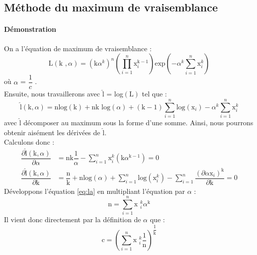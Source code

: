 \subsection{Méthode du maximum de vraisemblance}
\paragraph{Démonstration}
\noindent On a l'équation de maximum de vraisemblance : \\
\begin{equation}
\mbox{L}\left(\mbox{k },\alpha \right) = \left( \mbox{k} \alpha^{k} \right)^{n} \left( \prod\limits_{i=1}^{n} \mbox{x}^{\mbox{k}-1}_{i} \right) \mbox{exp}\left( -\alpha^{k} \sum\limits_{i=1}^n \mbox{x}^{k}_{i}\right)
\end{equation}
où $\alpha$ = $\dfrac{1}{c}$ . \\
Ensuite, nous travaillerons avec $\hat{\mbox{l}}$ = log$\left( \mbox{L} \right)$ tel que : 
\begin{equation}
\hat{\mbox{l}}(\mbox{k},\alpha) = \mbox{nlog}(\mbox{k}) + \mbox{nk log}(\alpha) + (\mbox{k}-1) \sum\limits_{i=1}^{n}\mbox{log}(\mbox{x}_{i}) - \alpha^{k} \sum\limits_{i=1}^{n} \mbox{x}^{k}_{i}
\end{equation}
avec $\hat{\mbox{l}}$ décomposer au maximum sous la forme d'une somme. Ainsi, nous pourrons obtenir aisément les dérivées de $\hat{\mbox{l}}$. \\
Calculons donc :
\begin{align}
\dfrac{\partial\hat{\mbox{l}}(\mbox{k},\alpha)}{\partial \alpha} &= \mbox{nk} \dfrac{1}{\alpha} - \sum\limits_{i=1}^{n} \mbox{x}^{k}_{i} \left( \mbox{k} \alpha^{\mbox{k}-1} \right) = 0 \label{eq:la} \\ \label{eq:lk}
\dfrac{\partial\hat{\mbox{l}}(\mbox{k},\alpha)}{\partial \mbox{k}} &= \dfrac{\mbox{n}}{\mbox{k}} + \mbox{n}\mbox{log}(\alpha) + \sum\limits_{i=1}^{n} \mbox{log}(\mbox{x}^{k}_{i}) - \sum\limits_{i=1}^{n} \dfrac{(\partial \alpha \mbox{x}_{i})^{\mbox{k}}}{\partial \mbox{k}} = 0
\end{align}
Développons l'équation \ref{eq:la} en multipliant l'équation par $\alpha$ :
\begin{equation}
\mbox{n} = \sum\limits_{i=1}^{n} \mbox{x }^{k}_{i} \alpha^{\mbox{k}} 
\end{equation}
Il vient donc directement par la définition de $\alpha$ que :
\begin{equation}
\mbox{c} = \left(\sum\limits_{i=1}^{n} \mbox{x }^{k}_{i}\dfrac{1}{\mbox{n}}\right)^{\dfrac{1}{\mbox{k}}} \label{c}
\end{equation}
